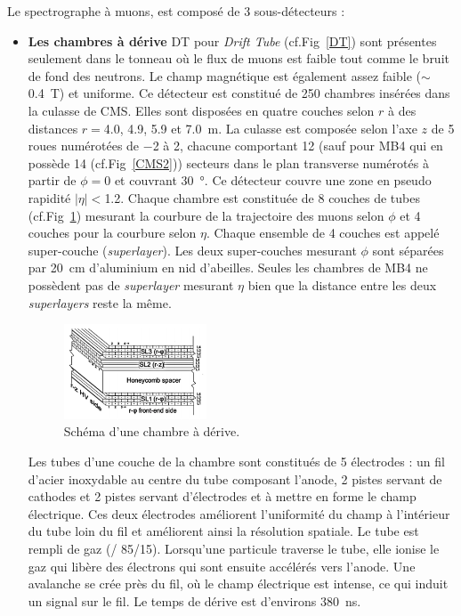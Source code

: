 Le spectrographe à muons, est composé de \num{3} sous-détecteurs :
\begin{itemize}[label=$\bullet$]
	\item \textbf{Les chambres à dérive} DT pour \textit{Drift Tube} (cf.Fig~\ref{DT}) sont présentes seulement dans le tonneau où le flux de muons est faible tout comme le bruit de fond des neutrons. Le champ magnétique est également assez faible ($\sim$\SI{0.4}{\tesla}) et uniforme. Ce détecteur est constitué de \num{250} chambres insérées dans la culasse de CMS. Elles sont disposées en quatre couches selon $r$ à des distances $r=$\num{4.0}, \num{4.9}, \num{5.9} et \SI{7.0}{\meter}. La culasse est composée selon l'axe $z$ de \num{5} roues numérotées de $-$\num{2} à \num{2}, chacune comportant \num{12} (sauf pour MB4 qui en possède \num{14} (cf.Fig~\ref{CMS2})) secteurs dans le plan transverse numérotés à partir de $\phi=$\num{0} et couvrant \SI{30}{\degree}. Ce détecteur couvre une zone en pseudo rapidité $|\eta|<$\num{1.2}. Chaque chambre est constituée de \num{8} couches de tubes (cf.Fig~\ref{DT1}) mesurant la courbure de la trajectoire des muons selon $\phi$ et \num{4} couches pour la courbure selon $\eta$. Chaque ensemble de \num{4} couches est appelé super-couche (\textit{superlayer}). Les deux super-couches mesurant $\phi$ sont séparées par \SI{20}{\centi\meter} d'aluminium en nid d'abeilles. Seules les chambres de MB4 ne possèdent pas de \textit{superlayer} mesurant $\eta$ bien que la distance entre les deux \textit{superlayers} reste la même.
	\begin{figure}[ht!]
		\centering
		\includegraphics[width=0.40\textwidth]{CMS/DTchamber.png}
		\captionsetup{type=figure}\caption{Schéma d'une chambre à dérive.}
		\label{DT1}
	\end{figure}

    Les tubes d'une couche de la chambre sont constitués de \num{5} électrodes : un fil d'acier inoxydable au centre du tube composant l'anode, \num{2} pistes servant de cathodes et \num{2} pistes servant d'électrodes et à mettre en forme le champ électrique. Ces deux électrodes améliorent l'uniformité du champ à l'intérieur du tube loin du fil et améliorent ainsi la résolution spatiale. Le tube est rempli de gaz (/ \num{85}/\num{15}). Lorsqu'une particule traverse le tube, elle ionise le gaz qui libère des électrons qui sont ensuite accélérés vers l'anode. Une avalanche se crée près du fil, où le champ électrique est intense, ce qui induit un signal sur le fil. Le temps de dérive est d'environs \SI{380}{\nano\second}. 
    

\end{itemize}
